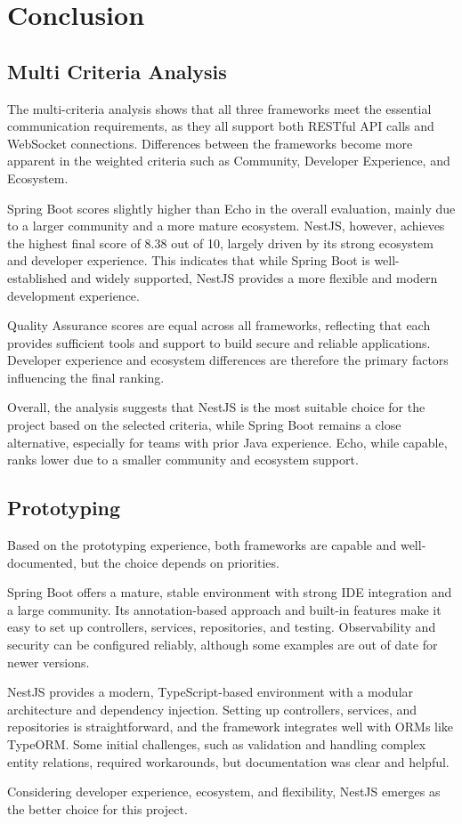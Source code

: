 \section{Conclusion}\label{sec:conclusion}
\subsection{Multi Criteria Analysis}
The multi-criteria analysis shows that all three frameworks meet the essential communication requirements, as they all support both RESTful API calls and WebSocket connections.
Differences between the frameworks become more apparent in the weighted criteria such as Community, Developer Experience, and Ecosystem.

Spring Boot scores slightly higher than Echo in the overall evaluation, mainly due to a larger community and a more mature ecosystem.
NestJS, however, achieves the highest final score of 8.38 out of 10, largely driven by its strong ecosystem and developer experience.
This indicates that while Spring Boot is well-established and widely supported, NestJS provides a more flexible and modern development experience.

Quality Assurance scores are equal across all frameworks, reflecting that each provides sufficient tools and support to build secure and reliable applications.
Developer experience and ecosystem differences are therefore the primary factors influencing the final ranking.

Overall, the analysis suggests that NestJS is the most suitable choice for the project based on the selected criteria, while Spring Boot remains a close alternative, especially for teams with prior Java experience.
Echo, while capable, ranks lower due to a smaller community and ecosystem support.

\subsection{Prototyping}
Based on the prototyping experience, both frameworks are capable and well-documented, but the choice depends on priorities.

Spring Boot offers a mature, stable environment with strong IDE integration and a large community.
Its annotation-based approach and built-in features make it easy to set up controllers, services, repositories, and testing.
Observability and security can be configured reliably, although some examples are out of date for newer versions.

NestJS provides a modern, TypeScript-based environment with a modular architecture and dependency injection.
Setting up controllers, services, and repositories is straightforward, and the framework integrates well with ORMs like TypeORM.
Some initial challenges, such as validation and handling complex entity relations, required workarounds, but documentation was clear and helpful.

Considering developer experience, ecosystem, and flexibility, NestJS emerges as the better choice for this project.
